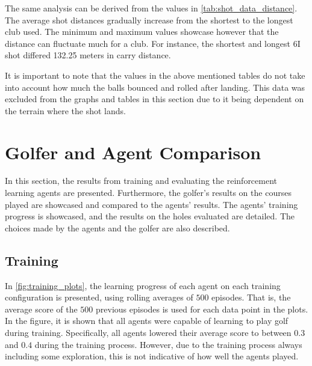 \documentclass{kththesis}
\begin{document}
The same analysis can be derived from the values in \autoref{tab:shot_data_distance}. The average shot distances gradually increase from the shortest to the longest club used. The minimum and maximum values showcase however that the distance can fluctuate much for a club. For instance, the shortest and longest 6I shot differed 132.25 meters in carry distance. 

It is important to note that the values in the above mentioned tables do not take into account how much the balls bounced and rolled after landing. This data was excluded from the graphs and tables in this section due to it being dependent on the terrain where the shot lands.

\section{Golfer and Agent Comparison}
In this section, the results from training and evaluating the reinforcement learning agents are presented. Furthermore, the golfer's results on the courses played are showcased and compared to the agents' results. The agents' training progress is showcased, and the results on the holes evaluated are detailed. The choices made by the agents and the golfer are also described.

\subsection{Training}
In \autoref{fig:training_plots}, the learning progress of each agent on each training configuration is presented, using rolling averages of $500$ episodes. That is, the average score of the $500$ previous episodes is used for each data point in the plots. In the figure, it is shown that all agents were capable of learning to play golf during training. Specifically, all agents lowered their average score to between $0.3$ and $0.4$ during the training process. However, due to the training process always including some exploration, this is not indicative of how well the agents played.
\end{document}
